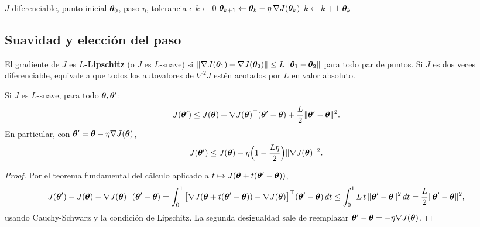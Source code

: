 \begin{algorithm}[ht]
\caption{Descenso por gradiente con paso fijo.}
\label{alg:gd}
\begin{algorithmic}[1]
\Require $J$ diferenciable, punto inicial $\boldsymbol{\theta}_0$, paso $\eta$, tolerancia $\epsilon$
\State $k \gets 0$
  \State $\boldsymbol{\theta}_{k+1} \gets \boldsymbol{\theta}_k - \eta\,\nabla J(\boldsymbol{\theta}_k)$
  \State $k \gets k + 1$
\EndWhile
\State \Return $\boldsymbol{\theta}_k$
\end{algorithmic}
\end{algorithm}

\subsection{Suavidad y elección del paso}

\begin{definicion}
El gradiente de $J$ es \textbf{$L$-Lipschitz} (o $J$ es $L$-suave) si
$\lVert\nabla J(\boldsymbol{\theta}_1) - \nabla J(\boldsymbol{\theta}_2)\rVert \le L\,\lVert\boldsymbol{\theta}_1 - \boldsymbol{\theta}_2\rVert$ para todo par de puntos.
Si $J$ es dos veces diferenciable, equivale a que todos los autovalores de $\nabla^2 J$ estén acotados por $L$
en valor absoluto.
\end{definicion}

\begin{lema}
\label{lem:descenso}
Si $J$ es $L$-suave, para todo $\boldsymbol{\theta}, \boldsymbol{\theta}'$:
\begin{equation}
  J(\boldsymbol{\theta}') \le J(\boldsymbol{\theta}) + \nabla J(\boldsymbol{\theta})^\top(\boldsymbol{\theta}' - \boldsymbol{\theta}) + \frac{L}{2}\lVert\boldsymbol{\theta}' - \boldsymbol{\theta}\rVert^2.
  \label{eq:descenso}
\end{equation}
En particular, con $\boldsymbol{\theta}' = \boldsymbol{\theta} - \eta\nabla J(\boldsymbol{\theta})$,
\begin{equation}
  J(\boldsymbol{\theta}') \le J(\boldsymbol{\theta}) - \eta\Big(1 - \frac{L\eta}{2}\Big)\lVert\nabla J(\boldsymbol{\theta})\rVert^2.
\end{equation}
\end{lema}
\begin{proof}
Por el teorema fundamental del cálculo aplicado a $t \mapsto J(\boldsymbol{\theta} + t(\boldsymbol{\theta}'-\boldsymbol{\theta}))$,
\[
  J(\boldsymbol{\theta}') - J(\boldsymbol{\theta}) - \nabla J(\boldsymbol{\theta})^\top(\boldsymbol{\theta}'-\boldsymbol{\theta})
  = \int_0^1 \big[\nabla J(\boldsymbol{\theta} + t(\boldsymbol{\theta}'-\boldsymbol{\theta})) - \nabla J(\boldsymbol{\theta})\big]^\top(\boldsymbol{\theta}'-\boldsymbol{\theta})\,dt
  \le \int_0^1 L\,t\,\lVert\boldsymbol{\theta}'-\boldsymbol{\theta}\rVert^2\,dt = \frac{L}{2}\lVert\boldsymbol{\theta}'-\boldsymbol{\theta}\rVert^2,
\]
usando Cauchy-Schwarz y la condición de Lipschitz. La segunda desigualdad sale de reemplazar
$\boldsymbol{\theta}' - \boldsymbol{\theta} = -\eta\nabla J(\boldsymbol{\theta})$.
\end{proof}

